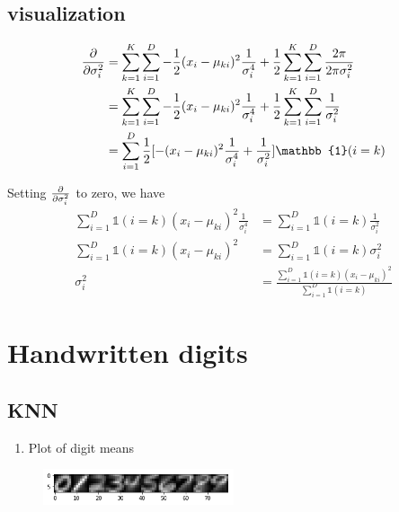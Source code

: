 \documentclass[letterpaper, 12]{article}
\begin{document}
 
\subsection{visualization}
\begin{equation*}
\begin{split}
\pdv{}{\sigma_{i} ^2} &= \sum_{k = 1}^{K} \sum_{i = 1}^{D} - \frac{1}{2}(x_{i} - \mu_{ki})^2 \frac{1}{\sigma_{i} ^4} + \frac{1}{2}\sum_{k = 1}^{K} \sum_{i = 1}^{D} \frac{2 \pi}{2\pi \sigma_{i} ^2}\\
&=  \sum_{k = 1}^{K} \sum_{i = 1}^{D} - \frac{1}{2}(x_{i} - \mu_{ki})^2 \frac{1}{\sigma_{i} ^4} + \frac{1}{2}\sum_{k = 1}^{K} \sum_{i = 1}^{D} \frac{1}{ \sigma_{i} ^2}\\
&=  \sum_{i = 1}^{D} \frac{1}{2} [ -(x_{i} - \mu_{ki})^2 \frac{1}{\sigma_{i} ^4} + \frac{1}{\sigma_{i} ^2}]{\mathbb{1} ( i = k)}\\
\end{split}
\end{equation*}
 
Setting $\pdv{}{\sigma_{i} ^2}$ to zero, we have\\

\begin{equation*}
\begin{split}
\sum_{i = 1}^{D} {\mathbb{1} ( i = k)} (x_{i} - \mu_{ki})^2 \frac{1}{\sigma_{i} ^4}
&= \sum_{i=1}^{D} {\mathbb{1} ( i = k)} \frac{1}{\sigma_{i} ^2}\\
\sum_{i = 1}^{D} {\mathbb{1} ( i = k)} (x_{i} - \mu_{ki})^2 
&= \sum_{i=1}^{D} {\mathbb{1} ( i = k)} \sigma_{i} ^2\\
\sigma_{i} ^2 &= \frac{\sum_{i = 1}^{D} {\mathbb{1} ( i = k)} (x_{i} - \mu_{ki})^2}{\sum_{i=1}^{D} {\mathbb{1} ( i = k)}}
\end{split}
\end{equation*}

\section{Handwritten digits}
\subsection{KNN}
\begin{enumerate}
\item Plot of digit means
\end{enumerate}

\begin{figure}[H]
\centering
\includegraphics[width=0.5\textwidth]{q2_0_nums.png}
\caption{\label{}}
\end{figure}
\end{document}
